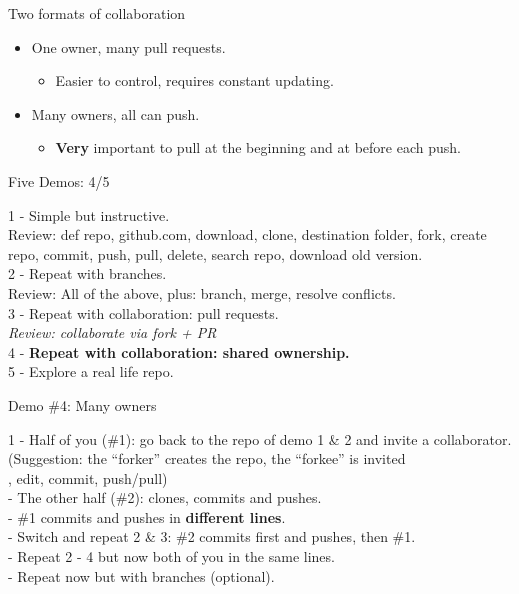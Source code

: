 \documentclass[ignorenonframetext,]{beamer}
\providecommand{\tightlist}{%
  \setlength{\itemsep}{0pt}\setlength{\parskip}{0pt}}
\begin{document}
\begin{frame}{Two formats of collaboration}
\protect\hypertarget{two-formats-of-collaboration}{}

\begin{itemize}
\tightlist
\item
  One owner, many pull requests.

  \begin{itemize}
  \tightlist
  \item
    Easier to control, requires constant updating.\\
  \end{itemize}
\item
  Many owners, all can push.

  \begin{itemize}
  \tightlist
  \item
    \textbf{Very} important to pull at the beginning and at before each
    push.
  \end{itemize}
\end{itemize}

\end{frame}

\begin{frame}{Five Demos: 4/5}
\protect\hypertarget{five-demos-45}{}

1 - Simple but instructive.\\
Review: def repo, github.com, download, clone, destination folder, fork,
create repo, commit, push, pull, delete, search repo, download old
version.\\
2 - Repeat with branches.\\
Review: All of the above, plus: branch, merge, resolve conflicts.\\
3 - Repeat with collaboration: pull requests.\\
\emph{Review: collaborate via fork + PR}\\
4 - \textbf{Repeat with collaboration: shared ownership. }\\
5 - Explore a real life repo.

\end{frame}

\begin{frame}{Demo \#4: Many owners}
\protect\hypertarget{demo-4-many-owners}{}

1 - Half of you (\#1): go back to the repo of demo 1 \& 2 and invite a
collaborator.\\
(Suggestion: the ``forker'' creates the repo, the ``forkee'' is
invited\\
, edit, commit, push/pull)\\
 - The other half (\#2): clones, commits and pushes.\\
 - \#1 commits and pushes in \textbf{different lines}.\\
 - Switch and repeat 2 \& 3: \#2 commits first and pushes,
then \#1.\\
 - Repeat 2 - 4 but now both of you in the same lines.\\
 - Repeat now but with branches (optional).

\end{frame}
\end{document}
